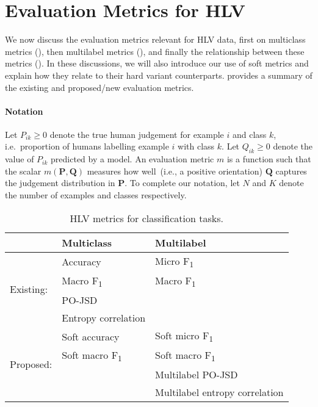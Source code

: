 \documentclass[shortpaper]{clv2025}
\newcommand{\pojsd}{PO-JSD\xspace}
\begin{document}
\section{Evaluation Metrics for HLV}\label{sec:eval-metrics}


We now discuss the evaluation metrics relevant for HLV data, first on
multiclass metrics (), then multilabel metrics
(), and finally the relationship between these metrics
(). In these discussions, we will also introduce our use of
soft metrics and explain how they relate to their hard variant counterparts.
 provides a summary of the existing and proposed/new
evaluation metrics.

\paragraph{Notation}

Let $P_{ik}\geq 0$ denote the true human judgement for example $i$ and class
$k$, i.e.\ proportion of humans labelling example $i$ with class $k$.
Let $Q_{ik}\geq 0$ denote the value of $P_{ik}$
predicted by a model.
An evaluation metric $m$ is a function such that the scalar
$m(\mathbf{P},\mathbf{Q})$ measures how well~(i.e., a positive orientation)
$\mathbf{Q}$ captures the judgement distribution in $\mathbf{P}$.
To complete our
notation, let $N$ and $K$ denote the number of examples and classes
respectively.

\begin{table}
  \caption{HLV metrics for classification tasks.}\label{tbl:metrics}
  \begin{tabular}{@{}lll@{}}
    \toprule
                               & Multiclass                    & Multilabel                     \\
    \midrule
    \multirow{4}{*}{Existing:} & Accuracy                      & Micro F\textsubscript{1}       \\
                               & Macro F\textsubscript{1}      & Macro F\textsubscript{1}       \\
                               & \pojsd                        &                                \\
                               & Entropy correlation           &                                \\
    \cmidrule{1-3}
    \multirow{4}{*}{Proposed:} & Soft accuracy                 & Soft micro F\textsubscript{1}  \\
                               & Soft macro F\textsubscript{1} & Soft macro F\textsubscript{1}  \\
                               &                               & Multilabel \pojsd              \\
                               &                               & Multilabel entropy correlation \\
    \bottomrule
  \end{tabular}
\end{table}
\end{document}
